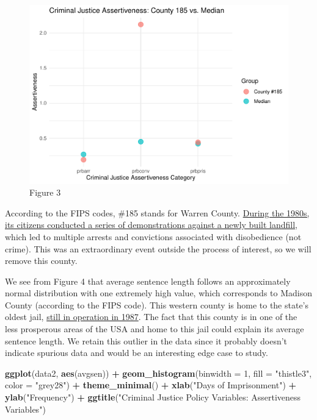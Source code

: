 \documentclass[]{article}
\newenvironment{Shaded}{\begin{snugshade}}{\end{snugshade}}
\newcommand{\DataTypeTok}[1]{\textcolor[rgb]{0.13,0.29,0.53}{#1}}
\newcommand{\DecValTok}[1]{\textcolor[rgb]{0.00,0.00,0.81}{#1}}
\newcommand{\KeywordTok}[1]{\textcolor[rgb]{0.13,0.29,0.53}{\textbf{#1}}}
\newcommand{\NormalTok}[1]{#1}
\newcommand{\OperatorTok}[1]{\textcolor[rgb]{0.81,0.36,0.00}{\textbf{#1}}}
\newcommand{\StringTok}[1]{\textcolor[rgb]{0.31,0.60,0.02}{#1}}
\begin{document}
\begin{figure}

{\centering \includegraphics{lab_3_final_files/figure-latex/unnamed-chunk-15-1} 

}

\caption{Figure 3}\label{fig:unnamed-chunk-15}
\end{figure}

According to the FIPS codes, \#185 stands for Warren County.
\href{https://en.wikipedia.org/wiki/Warren_County_PCB_Landfill}{During
the 1980s, its citizens conducted a series of demonstrations against a
newly built landfill}, which led to multiple arrests and convictions
associated with disobedience (not crime). This was an extraordinary
event outside the process of interest, so we will remove this county.

We see from Figure 4 that average sentence length follows an
approximately normal distribution with one extremely high value, which
corresponds to Madison County (according to the FIPS code). This western
county is home to the state's oldest jail,
\href{https://mountainx.com/news/murky-future-for-madisons-historic-jailhouse/}{still
in operation in 1987}. The fact that this county is in one of the less
prosperous areas of the USA and home to this jail could explain its
average sentence length. We retain this outlier in the data since it
probably doesn't indicate spurious data and would be an interesting edge
case to study.

\begin{Shaded}
\begin{Highlighting}[]
\KeywordTok{ggplot}\NormalTok{(data2, }\KeywordTok{aes}\NormalTok{(avgsen)) }\OperatorTok{+}
\StringTok{  }\KeywordTok{geom_histogram}\NormalTok{(}\DataTypeTok{binwidth =} \DecValTok{1}\NormalTok{, }\DataTypeTok{fill =} \StringTok{"thistle3"}\NormalTok{, }\DataTypeTok{color =} \StringTok{"grey28"}\NormalTok{) }\OperatorTok{+}
\StringTok{  }\KeywordTok{theme_minimal}\NormalTok{() }\OperatorTok{+}
\StringTok{  }\KeywordTok{xlab}\NormalTok{(}\StringTok{"Days of Imprisonment"}\NormalTok{) }\OperatorTok{+}
\StringTok{  }\KeywordTok{ylab}\NormalTok{(}\StringTok{"Frequency"}\NormalTok{) }\OperatorTok{+}
\StringTok{  }\KeywordTok{ggtitle}\NormalTok{(}\StringTok{"Criminal Justice Policy Variables: Assertiveness Variables"}\NormalTok{)}
\end{Highlighting}
\end{Shaded}
\end{document}
